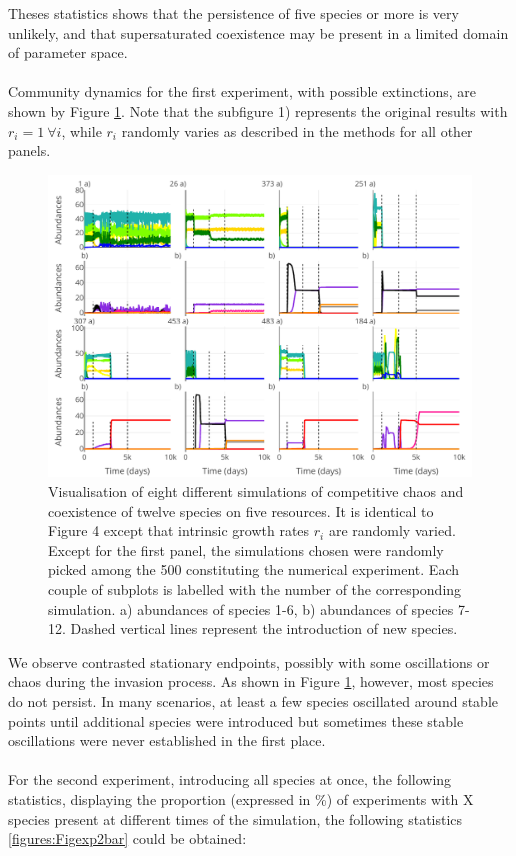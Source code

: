 Theses statistics shows that the persistence of five species or more is very unlikely, and that supersaturated coexistence may be present in a limited domain of parameter space.\\
\\
Community dynamics for the first experiment, with possible extinctions, are shown by Figure \ref{figures:Figexp1}. Note that the subfigure 1) represents the original results with $r_i=1 ~\forall i$, while $r_i$ randomly varies as described in the methods for all other panels. 

\begin{figure}[H]
\begin{center} 
 \includegraphics[width=1\textwidth]{../Code/Figures/Figure_exp1.pdf}
  \caption{Visualisation of eight different simulations of competitive chaos and coexistence of twelve species on five resources. It is identical to Figure 4 except that intrinsic growth rates $r_i$ are randomly varied. Except for the first panel, the simulations chosen were randomly picked among the 500 constituting the numerical experiment. Each couple of subplots is labelled with the number of the corresponding simulation. a) abundances of species 1-6, b) abundances of species 7-12. Dashed vertical lines represent the introduction of new species.}
  \label{figures:Figexp1}
\end{center}
\end{figure}

We observe contrasted stationary endpoints, possibly with some oscillations or chaos during the invasion process. As shown in Figure \ref{figures:Figexp1}, however, most species do not persist. In many scenarios, at least a few species oscillated around stable points until additional species were introduced but sometimes these stable oscillations were never established in the first place.\\
\\
For the second experiment, introducing all species at once, the following statistics, displaying the proportion (expressed in \%) of experiments with X species present at different times of the simulation, the following statistics \ref{figures:Figexp2bar} could be obtained:\\

